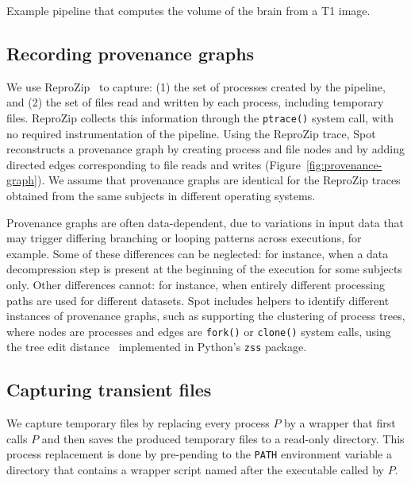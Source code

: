 \documentclass[a4paper,num-refs]{oup-contemporary}
\newcommand{\revised}[1]{\color{blue}#1\color{black}\xspace}
\newcommand{\reprozip}[0]{ReproZip\xspace}
\newcommand{\toolname}[0]{Spot\xspace}
\begin{document}
\begin{listing}
  \inputminted{bash}{"data/example/example.sh"}
  \caption{\revised{Example pipeline that computes the volume of the brain from a T1 image.}}
  \label{listing:sample-script}
\end{listing}

\subsection{Recording provenance graphs}

We use \reprozip~\cite{rampin2016reprozip}
to capture: (1) the set of processes created by the
pipeline, and
(2) the set of files read and written by each process, including
temporary files. \reprozip collects this information through the
\texttt{ptrace()} system call, with no required instrumentation of the pipeline.
Using the \reprozip trace, \toolname reconstructs a provenance graph by creating process and file
nodes and by adding directed edges corresponding
to file reads and writes (Figure~\ref{fig:provenance-graph}).
\revised{We assume that provenance graphs are identical for the \reprozip traces obtained from
the same subjects in different operating systems.}

Provenance graphs are often data-dependent, due to variations in input data that
may trigger differing branching or looping patterns across executions, for example.
Some of these differences can be neglected: for instance, when a data
decompression step is present at the beginning of the execution for some
subjects only. Other differences cannot: for instance, when entirely
different processing paths are used for different datasets. \toolname
includes helpers to identify different instances of provenance graphs,
such as supporting the clustering of process trees, where nodes are processes and
edges are \texttt{fork()} or \texttt{clone()} system calls, using the tree
edit distance~\cite{zhang1989simple} implemented in Python's \texttt{zss} package.

\subsection{Capturing transient files}

We capture temporary files by replacing every
process $P$ by a wrapper that first calls $P$ and then saves the produced
temporary files to a read-only directory. This process replacement is done by pre-pending
 to the \texttt{PATH} environment
variable a directory that contains a wrapper script named after the executable
called by $P$.
\end{document}

